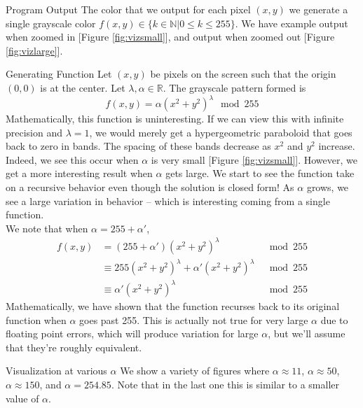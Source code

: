 \documentclass[11pt]{article}
\newcommand{\reffig}[1]{[Figure \ref{#1}]}
\begin{document}
\begin{section}{Program Output}
The color that we output for each pixel $(x, y)$ we generate a single grayscale color $f(x, y) \in \{k \in \mathbb{N}|0 \le k \le 255\}$. We have example output when zoomed in \reffig{fig:vizsmall}, and output when zoomed out \reffig{fig:vizlarge}. 



\begin{subsection}{Generating Function}
Let $(x, y)$ be pixels on the screen such that the origin $(0, 0)$ is at the center. Let $\lambda, \alpha \in \mathbb{R}$. The grayscale pattern formed is 
\[f(x, y) = \alpha (x^2 + y^2)^\lambda \mod 255 \]
Mathematically, this function is uninteresting. If we can view this with infinite precision and $\lambda = 1$, we would merely get a hypergeometric paraboloid that goes back to zero in bands. The spacing of these bands decrease as $x^2$ and $y^2$ increase. Indeed, we see this occur when $\alpha$ is very small \reffig{fig:vizsmall}. However, we get a more interesting result when $\alpha$ gets large. We start to see the function take on a recursive behavior even though the solution is closed form! As $\alpha$ grows, we see a large variation in behavior -- which is interesting coming from a single function.\\


We note that when $\alpha = 255 + \alpha'$,
\begin{align*}
f(x, y) &= (255 + \alpha') (x^2 + y^2)^\lambda &\mod 255 \\
&\equiv 255(x^2 + y^2)^\lambda + \alpha'(x^2+y^2)^\lambda & \mod 255\\
&\equiv \alpha' (x^2 + y^2)^\lambda & \mod 255
\end{align*}
Mathematically, we have shown that the function recurses back to its original function when $\alpha$ goes past 255. This is actually not true for very large $\alpha$ due to floating point errors, which will produce variation for large $\alpha$, but we'll assume that they're roughly equivalent.\\
\end{subsection}
\begin{subsection}{Visualization at various $\alpha$}
We show a variety of figures where $\alpha \approx 11$, $\alpha \approx 50$, $\alpha \approx 150$, and $\alpha = 254.85$. Note that in the last one this is similar to a smaller value of $\alpha$. \\


\end{subsection}
\end{section}
\end{document}
